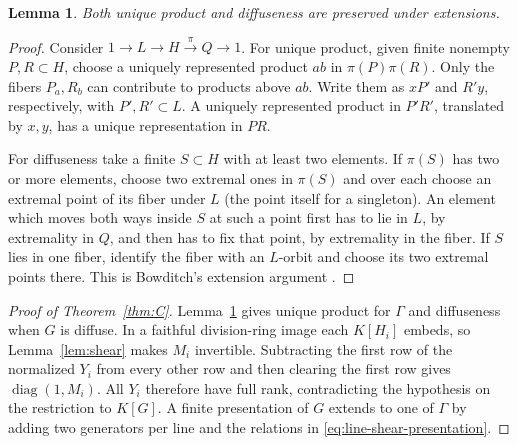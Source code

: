 \documentclass[11pt,a4paper]{article}
\newtheorem{lemma}[theorem]{Lemma}
\numberwithin{equation}{section}
\DeclareMathOperator{\diag}{diag}
\begin{document}
\begin{lemma}\label{lem:extension}
Both unique product and diffuseness are preserved under extensions.
\end{lemma}
\begin{proof}
Consider \(1\to L\to H\xrightarrow{\pi}Q\to1\). For unique product, given finite nonempty \(P,R\subset H\), choose a uniquely represented product \(ab\) in \(\pi(P)\pi(R)\). Only the fibers \(P_a,R_b\) can contribute to products above \(ab\). Write them as \(xP'\) and \(R'y\), respectively, with \(P',R'\subset L\). A uniquely represented product in \(P'R'\), translated by \(x,y\), has a unique representation in \(PR\).

For diffuseness take a finite \(S\subset H\) with at least two elements. If \(\pi(S)\) has two or more elements, choose two extremal ones in \(\pi(S)\) and over each choose an extremal point of its fiber under \(L\) (the point itself for a singleton). An element which moves both ways inside \(S\) at such a point first has to lie in \(L\), by extremality in \(Q\), and then has to fix that point, by extremality in the fiber. If \(S\) lies in one fiber, identify the fiber with an \(L\)-orbit and choose its two extremal points there. This is Bowditch's extension argument \cite[Theorem~1.2(1)]{r6}.
\end{proof}

\begin{proof}[Proof of Theorem~\ref{thm:C}]
Lemma~\ref{lem:extension} gives unique product for \(\Gamma\) and diffuseness when \(G\) is diffuse. In a faithful division-ring image each \(K[H_i]\) embeds, so Lemma~\ref{lem:shear} makes \(M_i\) invertible. Subtracting the first row of the normalized \(Y_i\) from every other row and then clearing the first row gives \(\diag(1,M_i)\). All \(Y_i\) therefore have full rank, contradicting the hypothesis on the restriction to \(K[G]\). A finite presentation of \(G\) extends to one of \(\Gamma\) by adding two generators per line and the relations in \eqref{eq:line-shear-presentation}.
\end{proof}
\end{document}
